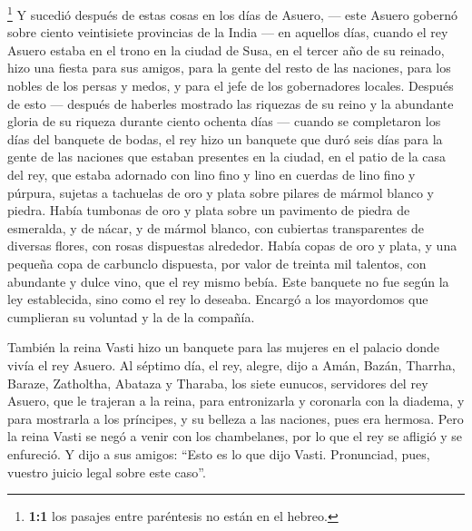 \footnote{\textbf{1:1} los pasajes entre paréntesis no están en el
  hebreo.} Y sucedió después de estas cosas en los días de Asuero, ---
este Asuero gobernó sobre ciento veintisiete provincias de la India ---
 en aquellos días, cuando el rey Asuero estaba en el trono
en la ciudad de Susa,  en el tercer año de su reinado,
hizo una fiesta para sus amigos, para la gente del resto de las
naciones, para los nobles de los persas y medos, y para el jefe de los
gobernadores locales.  Después de esto --- después de
haberles mostrado las riquezas de su reino y la abundante gloria de su
riqueza durante ciento ochenta días ---  cuando se
completaron los días del banquete de bodas, el rey hizo un banquete que
duró seis días para la gente de las naciones que estaban presentes en la
ciudad, en el patio de la casa del rey,  que estaba
adornado con lino fino y lino en cuerdas de lino fino y púrpura, sujetas
a tachuelas de oro y plata sobre pilares de mármol blanco y piedra.
Había tumbonas de oro y plata sobre un pavimento de piedra de esmeralda,
y de nácar, y de mármol blanco, con cubiertas transparentes de diversas
flores, con rosas dispuestas alrededor.  Había copas de
oro y plata, y una pequeña copa de carbunclo dispuesta, por valor de
treinta mil talentos, con abundante y dulce vino, que el rey mismo
bebía.  Este banquete no fue según la ley establecida,
sino como el rey lo deseaba. Encargó a los mayordomos que cumplieran su
voluntad y la de la compañía.

 También la reina Vasti hizo un banquete para las mujeres
en el palacio donde vivía el rey Asuero.  Al séptimo día,
el rey, alegre, dijo a Amán, Bazán, Tharrha, Baraze, Zatholtha, Abataza
y Tharaba, los siete eunucos, servidores del rey Asuero, 
que le trajeran a la reina, para entronizarla y coronarla con la
diadema, y para mostrarla a los príncipes, y su belleza a las naciones,
pues era hermosa.  Pero la reina Vasti se negó a venir
con los chambelanes, por lo que el rey se afligió y se enfureció.
 Y dijo a sus amigos: ``Esto es lo que dijo Vasti.
Pronunciad, pues, vuestro juicio legal sobre este caso''.

